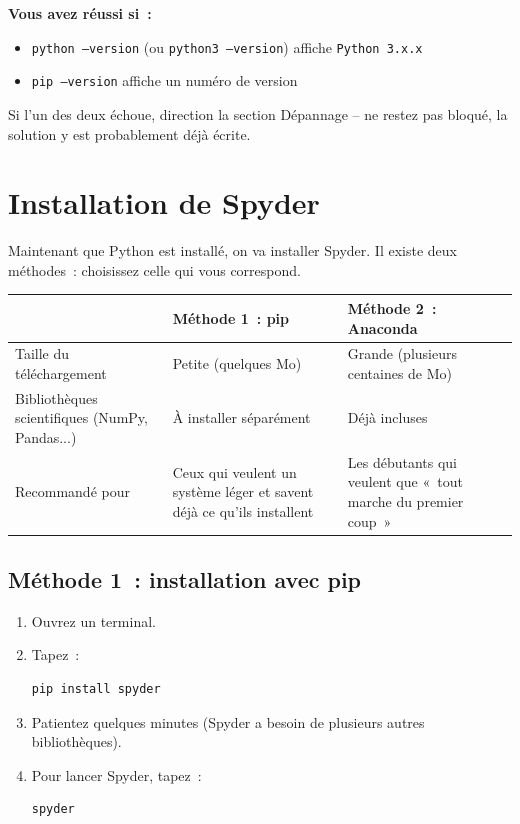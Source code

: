\documentclass[12pt,a4paper]{article}
\begin{document}
	\begin{reussite}
		\textbf{Vous avez réussi si~:}
		\begin{itemize}
			\item \texttt{python --version} (ou \texttt{python3 --version}) affiche \texttt{Python 3.x.x}
			\item \texttt{pip --version} affiche un numéro de version
		\end{itemize}
		Si l'un des deux échoue, direction la section Dépannage -- ne restez pas bloqué, la solution y est probablement déjà écrite.
	\end{reussite}
	
	\section{Installation de Spyder}
	
	Maintenant que Python est installé, on va installer Spyder. Il existe deux méthodes~: choisissez celle qui vous correspond.
	
	\begin{center}
		\begin{tabular}{|p{4.2cm}|p{5.3cm}|p{5.3cm}|}
			\hline
			& \textbf{Méthode 1~: pip} & \textbf{Méthode 2~: Anaconda} \\
			\hline
			Taille du téléchargement & Petite (quelques Mo) & Grande (plusieurs centaines de Mo) \\
			\hline
			Bibliothèques scientifiques (NumPy, Pandas...) & À installer séparément & Déjà incluses \\
			\hline
			Recommandé pour & Ceux qui veulent un système léger et savent déjà ce qu'ils installent & Les débutants qui veulent que «~tout marche du premier coup~» \\
			\hline
		\end{tabular}
	\end{center}
	
	\subsection{Méthode 1~: installation avec pip}
	
	\begin{etape}
		\begin{enumerate}
			\item Ouvrez un terminal.
			\item Tapez~:
			\begin{lstlisting}[language=bash]
				pip install spyder
			\end{lstlisting}
			\item Patientez quelques minutes (Spyder a besoin de plusieurs autres bibliothèques).
			\item Pour lancer Spyder, tapez~:
			\begin{lstlisting}[language=bash]
				spyder
			\end{lstlisting}
		\end{enumerate}
	\end{etape}
	
\end{document}
